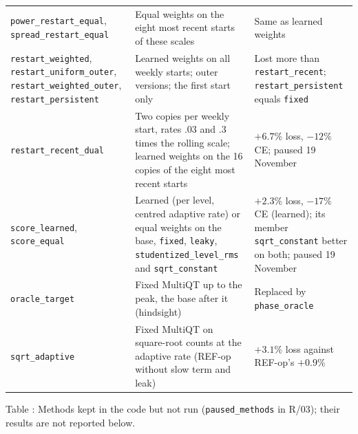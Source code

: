 \documentclass[11pt,a4paper]{article}
\theoremstyle{definition}
\theoremstyle{remark}
\begin{document}
\begin{center}
\begin{tabularx}{\textwidth}{@{}>{\raggedright\arraybackslash}p{}
 >{\raggedright\arraybackslash}X >{\raggedright\arraybackslash}p{}@{}}
\texttt{power\_restart\_equal}, \texttt{spread\_restart\_equal}
 & Equal weights on the eight most recent starts of these scales
 & Same as learned weights\\
\texttt{restart\_weighted}, \texttt{restart\_uniform\_outer},
\texttt{restart\_weighted\_outer}, \texttt{restart\_persistent}
 & Learned weights on all weekly starts; outer versions; the first start
   only
 & Lost more than \texttt{restart\_recent}; \texttt{restart\_persistent}
   equals \texttt{fixed}\\
\texttt{restart\_recent\_dual}
 & Two copies per weekly start, rates $.03$ and $.3$ times the rolling
   scale; learned weights on the 16 copies of the eight most recent starts
 & $+6.7\%$ loss, $-12\%$ CE; paused 19 November\\
\texttt{score\_learned}, \texttt{score\_equal}
 & Learned (per level, centred adaptive rate) or equal weights on the base,
   \texttt{fixed}, \texttt{leaky}, \texttt{studentized\_level\_rms} and
   \texttt{sqrt\_constant}
 & $+2.3\%$ loss, $-17\%$ CE (learned); its member \texttt{sqrt\_constant}
   better on both; paused 19 November\\
\texttt{oracle\_target}
 & Fixed MultiQT up to the peak, the base after it (hindsight)
 & Replaced by \texttt{phase\_oracle}\\
\texttt{sqrt\_adaptive}
 & Fixed MultiQT on square-root counts at the adaptive rate (REF-op
   without slow term and leak)
 & $+3.1\%$ loss against REF-op's $+0.9\%$\\
\bottomrule
\end{tabularx}
\end{center}
\label{tab:methods-paused}
\begin{center}\small Table \thetable: Methods kept in the code but not run
(\texttt{paused\_methods} in R/03); their results are not reported below.
\end{center}
\end{document}
